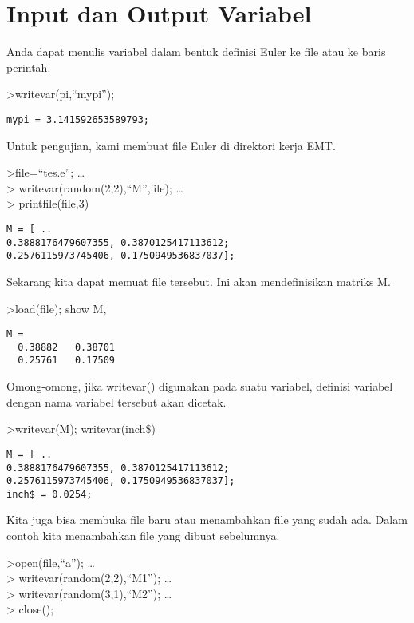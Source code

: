 \documentclass[
]{book}
\begin{document}
\chapter{Input dan Output Variabel}\label{input-dan-output-variabel}

Anda dapat menulis variabel dalam bentuk definisi Euler ke file atau ke baris perintah.

\textgreater writevar(pi,``mypi'');

\begin{verbatim}
mypi = 3.141592653589793;
\end{verbatim}

Untuk pengujian, kami membuat file Euler di direktori kerja EMT.

\textgreater file=``tes.e''; \ldots{}\\
\textgreater{} writevar(random(2,2),``M'',file); \ldots{}\\
\textgreater{} printfile(file,3)

\begin{verbatim}
M = [ ..
0.3888176479607355, 0.3870125417113612;
0.2576115973745406, 0.1750949536837037];
\end{verbatim}

Sekarang kita dapat memuat file tersebut. Ini akan mendefinisikan matriks M.

\textgreater load(file); show M,

\begin{verbatim}
M = 
  0.38882   0.38701 
  0.25761   0.17509 
\end{verbatim}

Omong-omong, jika writevar() digunakan pada suatu variabel, definisi variabel dengan nama variabel tersebut akan dicetak.

\textgreater writevar(M); writevar(inch\$)

\begin{verbatim}
M = [ ..
0.3888176479607355, 0.3870125417113612;
0.2576115973745406, 0.1750949536837037];
inch$ = 0.0254;
\end{verbatim}

Kita juga bisa membuka file baru atau menambahkan file yang sudah ada. Dalam contoh kita menambahkan file yang dibuat sebelumnya.

\textgreater open(file,``a''); \ldots{}\\
\textgreater{} writevar(random(2,2),``M1''); \ldots{}\\
\textgreater{} writevar(random(3,1),``M2''); \ldots{}\\
\textgreater{} close();
\end{document}
